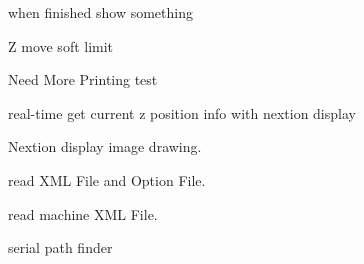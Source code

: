
\begin{DoxyRefList}
\item[\label{todo__todo000002}%
\Hypertarget{todo__todo000002}%
File \hyperlink{APP__MAIN_8c}{A\+P\+P\+\_\+\+M\+A\+IN.c} ]
\item[\label{todo__todo000003}%
\Hypertarget{todo__todo000003}%
File \hyperlink{APP__PRINTING_8c}{A\+P\+P\+\_\+\+P\+R\+I\+N\+T\+I\+NG.c} ]when finished show something  
\item[\label{todo__todo000004}%
\Hypertarget{todo__todo000004}%
File \hyperlink{SN__MODULE__3D__PRINTER_8c}{S\+N\+\_\+\+M\+O\+D\+U\+L\+E\+\_\+3\+D\+\_\+\+P\+R\+I\+N\+T\+ER.c} ]Z move soft limit 

Need More Printing test 

real-\/time get current z position info with nextion display  
\item[\label{todo__todo000005}%
\Hypertarget{todo__todo000005}%
File \hyperlink{SN__MODULE__DISPLAY_8c}{S\+N\+\_\+\+M\+O\+D\+U\+L\+E\+\_\+\+D\+I\+S\+P\+L\+AY.c} ]Nextion display image drawing.  
\item[\label{todo__todo000006}%
\Hypertarget{todo__todo000006}%
File \hyperlink{SN__MODULE__FILE__SYSTEM_8c}{S\+N\+\_\+\+M\+O\+D\+U\+L\+E\+\_\+\+F\+I\+L\+E\+\_\+\+S\+Y\+S\+T\+EM.c} ]read X\+ML File and Option File. 

read machine X\+ML File.  
\item[\label{todo__todo000001}%
\Hypertarget{todo__todo000001}%
File \hyperlink{SN__SYS__SERIAL__COMM_8c}{S\+N\+\_\+\+S\+Y\+S\+\_\+\+S\+E\+R\+I\+A\+L\+\_\+\+C\+O\+MM.c} ]serial path finder 
\end{DoxyRefList}